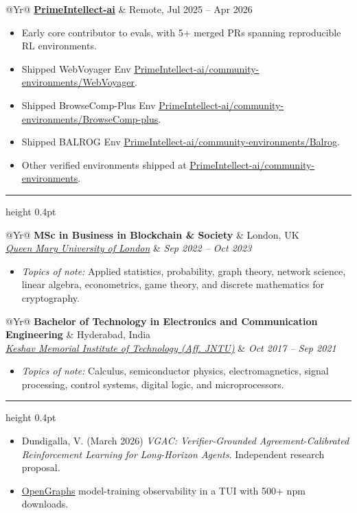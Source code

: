 \documentclass[10pt,letterpaper]{article}
\makeatletter
\newlength{\entryindent}
\newcommand{\resumeSection}[1]{%
  \vspace{0.62em}%
  \noindent{\fontsize{11.5}{13}\selectfont\scshape #1}\par
  \vspace{0.22em}%
  \hrule height 0.4pt
  \vspace{0.48em}%
}
\newcommand{\resumeSingleHeading}[2]{
  \begin{tabularx}{\textwidth}{@{\hspace{\entryindent}}Yr@{\hspace{4pt}}}
    {\fontsize{10}{11.3}\selectfont\textbf{#1}} & #2 \\
  \end{tabularx}\vspace{-0.25em}
}
\newcommand{\educationEntry}[4]{
  \begin{tabularx}{\textwidth}{@{\hspace{\entryindent}}Yr@{\hspace{4pt}}}
    {\fontsize{10}{11.3}\selectfont\textbf{#1}} & #2 \\
    \textit{#3} & \textit{#4} \\
  \end{tabularx}\vspace{0.12em}
}
\makeatother
\begin{document}
\resumeSingleHeading{\underline{PrimeIntellect-ai}}{Remote, Jul 2025 -- Apr 2026}
\begin{itemize}
  \item Early core contributor to evals, with 5+ merged PRs spanning reproducible RL environments.
  \item Shipped WebVoyager Env \href{https://github.com/PrimeIntellect-ai/community-environments/commit/b6c076c2b6ee77acb25dbfd76043c858ae0143d3}{\underline{PrimeIntellect-ai/community-environments/WebVoyager}}.
  \item Shipped BrowseComp-Plus Env \href{https://github.com/PrimeIntellect-ai/community-environments/commit/cadab2e00a68ea1b1ddec93adec345b98fe7d502}{\underline{PrimeIntellect-ai/community-environments/BrowseComp-plus}}.
  \item Shipped BALROG Env \href{https://github.com/PrimeIntellect-ai/community-environments/commit/e782084a6f67258f6cd8a209258084457e369204}{\underline{PrimeIntellect-ai/community-environments/Balrog}}.
  \item Other verified environments shipped at \href{https://github.com/PrimeIntellect-ai/community-environments/commits/main/?author=vyomakesh0728}{\underline{PrimeIntellect-ai/community-environments}}.
\end{itemize}

\resumeSection{Education}
\educationEntry{MSc in Business in Blockchain \& Society}{London, UK}{\underline{Queen Mary University of London}}{Sep 2022 -- Oct 2023}
\begin{itemize}
  \item \textit{Topics of note:} Applied statistics, probability, graph theory, network science, linear algebra, econometrics, game theory, and discrete mathematics for cryptography.
\end{itemize}
\educationEntry{Bachelor of Technology in Electronics and Communication Engineering}{Hyderabad, India}{\underline{Keshav Memorial Institute of Technology (Aff. JNTU)}}{Oct 2017 -- Sep 2021}
\begin{itemize}
  \item \textit{Topics of note:} Calculus, semiconductor physics, electromagnetics, signal processing, control systems, digital logic, and microprocessors.
\end{itemize}

\resumeSection{Other Projects \& Proposals}
\begin{itemize}
  \item Dundigalla, V. (March 2026) \textit{VGAC: Verifier-Grounded Agreement-Calibrated Reinforcement Learning for Long-Horizon Agents}. Independent research proposal.
  \item \href{https://github.com/vyomakesh0728/opengraphs}{\underline{OpenGraphs}} model-training observability in a TUI with 500+ npm downloads.
\end{itemize}
\end{document}
